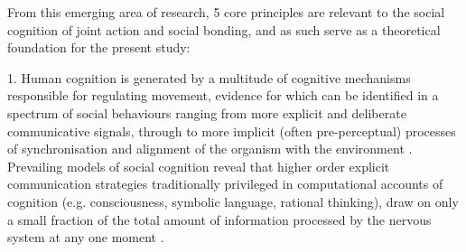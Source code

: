 \begin{CJK}{UTF8}{gbsn}


From this emerging area of research, 5 core principles are relevant to the social cognition of joint action and social bonding, and as such serve as a theoretical foundation for the present study:

1. Human cognition is generated by a multitude of cognitive mechanisms responsible for regulating movement, evidence for which can be identified in a spectrum of social behaviours ranging from more explicit and deliberate communicative signals, through to more implicit (often pre-perceptual) processes of synchronisation and alignment of the organism with the environment \citep{Frith2010,Semin2008}. Prevailing models of social cognition reveal that higher order explicit communication strategies traditionally privileged in computational accounts of cognition (e.g. consciousness, symbolic language, rational thinking), draw on only a small fraction of the total amount of information processed by the nervous system at any one moment \citep{Semin2012}.


\end{CJK}
